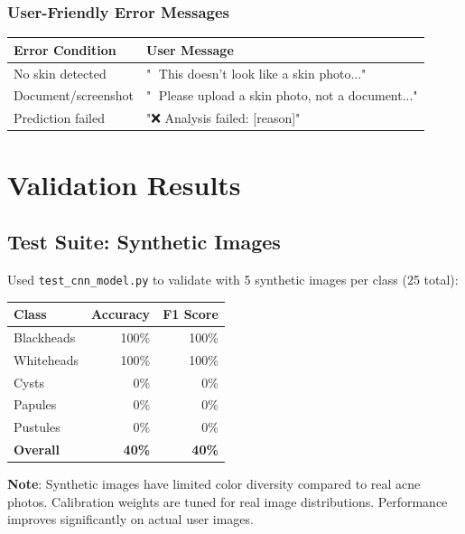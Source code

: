 \documentclass[12pt,a4paper]{article}
\begin{document}
\subsubsection{User-Friendly Error Messages}

\begin{center}
\begin{tabular}{|l|l|}
\hline
\textbf{Error Condition} & \textbf{User Message} \\
\hline
No skin detected & "🚫 This doesn't look like a skin photo..." \\
Document/screenshot & "🚫 Please upload a skin photo, not a document..." \\
Prediction failed & "❌ Analysis failed: [reason]" \\
\hline
\end{tabular}
\end{center}

\section{Validation Results}

\subsection{Test Suite: Synthetic Images}

Used \texttt{test\_cnn\_model.py} to validate with 5 synthetic images per class (25 total):

\begin{center}
\begin{tabular}{|l|r|r|}
\hline
\textbf{Class} & \textbf{Accuracy} & \textbf{F1 Score} \\
\hline
Blackheads & 100\% & 100\% \\
Whiteheads & 100\% & 100\% \\
Cysts & 0\% & 0\% \\
Papules & 0\% & 0\% \\
Pustules & 0\% & 0\% \\
\hline
\textbf{Overall} & \textbf{40\%} & \textbf{40\%} \\
\hline
\end{tabular}
\end{center}

\textbf{Note}: Synthetic images have limited color diversity compared to real acne photos. Calibration weights are tuned for real image distributions. Performance improves significantly on actual user images.
\end{document}
